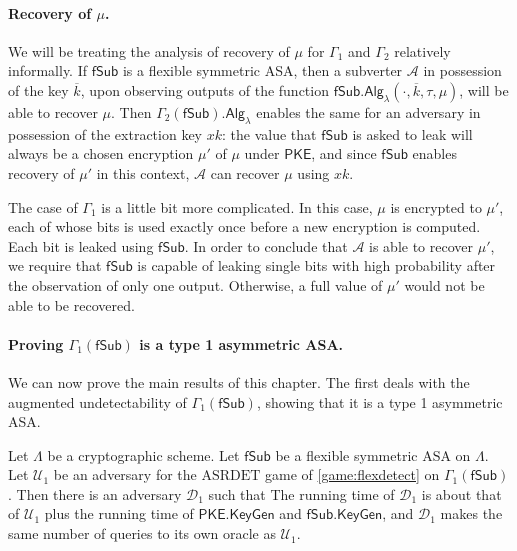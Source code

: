 \paragraph{Recovery of $\mu$.} We will be treating the analysis of recovery of $\mu$ for $\Gamma_1$ and $\Gamma_2$ relatively informally. If $\mathsf{fSub}$ is a flexible symmetric ASA, then a subverter $\mathcal{A}$ in possession of the key $\overline{k}$, upon observing outputs of the function $\mathsf{fSub.Alg}_\lambda(\cdot,\overline{k},\tau,\mu)$, will be able to recover $\mu$. Then $\Gamma_2(\mathsf{fSub})\mathsf{.Alg}_\lambda$ enables the same for an adversary in possession of the extraction key $xk$: the value that $\mathsf{fSub}$ is asked to leak will always be a chosen encryption $\mu'$ of $\mu$ under $\mathsf{PKE}$, and since $\mathsf{fSub}$ enables recovery of $\mu'$ in this context, $\mathcal{A}$ can recover $\mu$ using $xk$.

The case of $\Gamma_1$ is a little bit more complicated. In this case, $\mu$ is encrypted to $\mu'$, each of whose bits is used exactly once before a new encryption is computed. Each bit is leaked using $\mathsf{fSub}$. In order to conclude that $\mathcal{A}$ is able to recover $\mu'$, we require that $\mathsf{fSub}$ is capable of leaking single bits with high probability after the observation of only one output. Otherwise, a full value of $\mu'$ would not be able to be recovered.

\paragraph{Proving $\Gamma_1(\mathsf{fSub})$ is a type 1 asymmetric ASA.}
We can now prove the main results of this chapter. The first deals with the augmented undetectability of $\Gamma_1(\mathsf{fSub})$, showing that it is a type 1 asymmetric ASA.

\begin{theorem} \label{theorem:gen1}
Let $\mathsf{\Lambda}$ be a cryptographic scheme. Let $\mathsf{fSub}$ be a flexible symmetric $\mathrm{ASA}$ on $\mathsf{\Lambda}$. Let $\mathcal{U}_1$ be an adversary for the $\mathrm{ASRDET}$ game of \autoref{game:flexdetect} on $\Gamma_1(\mathsf{fSub})$. Then there is an adversary $\mathcal{D}_1$ such that
The running time of $\mathcal{D}_1$ is about that of $\mathcal{U}_1$ plus the running time of $\mathsf{PKE.KeyGen}$ and $\mathsf{fSub.KeyGen}$, and $\mathcal{D}_1$ makes the same number of queries to its own oracle as $\mathcal{U}_1$.
\end{theorem}

